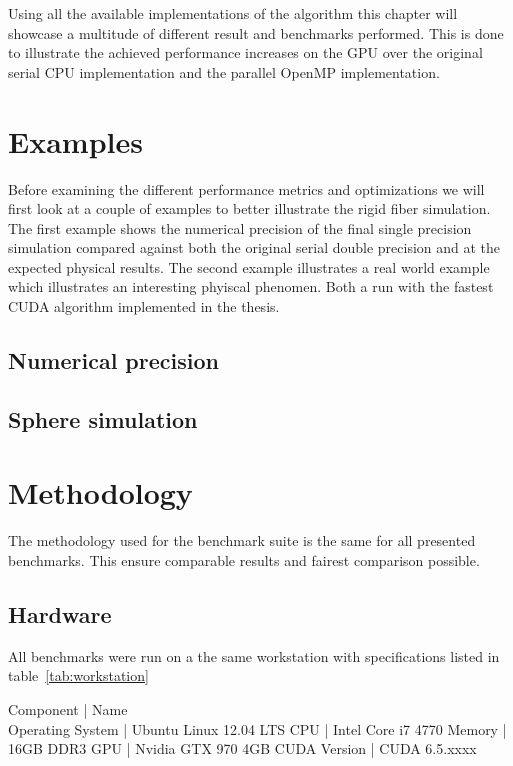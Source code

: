 \documentclass[a4paper,11pt]{kth-mag}
\begin{document}
Using all the available implementations of the algorithm this chapter will showcase a multitude of different result and benchmarks performed. This is done to illustrate the achieved performance increases on the GPU over the original serial CPU implementation and the parallel OpenMP implementation.

\section{Examples}

Before examining the different performance metrics and optimizations we will first look at a couple of examples to better illustrate the rigid fiber simulation. The first example shows the numerical precision of the final single precision simulation compared against both the original serial double precision and at the expected physical results. The second example illustrates a real world example which illustrates an interesting phyiscal phenomen. Both a run with the fastest CUDA algorithm implemented in the thesis.

\subsection{Numerical precision}
\subsection{Sphere simulation}

\section{Methodology}

The methodology used for the benchmark suite is the same for all presented benchmarks. This ensure comparable results and fairest comparison possible.

\subsection{Hardware}

All benchmarks were run on a the same workstation with specifications listed in table~\ref{tab:workstation}

\begin{tabulary}[l | l]
Component | Name \\
Operating System | Ubuntu Linux 12.04 LTS
CPU | Intel Core i7 4770
Memory | 16GB DDR3
GPU | Nvidia GTX 970 4GB
CUDA Version | CUDA 6.5.xxxx
\caption{Benchmark workstation specification.}
\label{tab:workstation}
\end{tabulary}
\end{document}

